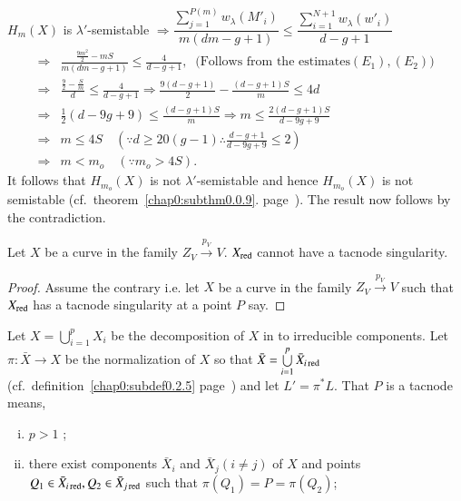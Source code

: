 { $H_{m} (X)$ is $\lambda'$-semistable $\Rightarrow
\dfrac{\sum\limits^{P(m)}_{j=1} w_{\lambda}(M'_{i})}{m (dm-g+1)} \le
\dfrac{\sum\limits^{N+1}_{i=1} w_{\lambda}(w'_{i})}{d-g+1}$  
\begin{align*}
\Rightarrow  & \frac{\frac{9m^{2}}{2} - mS}{m (dm - g+1)} \le
\frac{4}{d-g+1},  ~\text{ (Follows from the estimates} (E_{1}),
(E_{2}))\\ 
\Rightarrow & \frac{\frac{9}{2} - \frac{S}{m}}{d} \le \frac{4}{d - g +
  1} \Rightarrow \frac{9(d - g + 1)}{2} - \frac{(d-g+1)S}{m} \le 4d\\ 
\Rightarrow & \frac{1}{2} (d-9g+9) \le \frac{(d-g+1)S}{m} \Rightarrow
m\le \frac{2 (d-g+1)S}{d-9g+9}\\ 
\Rightarrow & m \le 4S   \quad (\because d \ge 20 (g-1)  \therefore
\frac{d-g+1}{d-9g+9} \le 2)\\ 
\Rightarrow & m < m_{o} \quad (\because  m_{o} > 4S).  
\end{align*}\pageoriginale
It follows that $H_{m_{o}}(X)$ is not $\lambda'$-semistable and hence
$H_{m_{o}}(X)$ is not semistable (cf.\ theorem~\ref{chap0:subthm0.0.9}. 
page~\pageref{chap0:subthm0.0.9}). The result now follows by the contradiction.   

\begin{subprop}\label{chap1:subprop1.0.6}%
 Let $X$ be a curve in the family $Z_{V}
 \xrightarrow{p_{V}}V$. $X_{\operatorname{red}}$  cannot have a tacnode singularity.  
\end{subprop}

\begin{proof}
Assume the contrary i.e. let $X$ be a curve in the family $Z_{V}
\xrightarrow{p_{V}}V$ such that $X_{\operatorname{red}}$ has a tacnode singularity
at a point $P$ say.  
\end{proof}

Let $X = \bigcup\limits^{p}_{i=1} X_{i}$ be the decomposition of $X$ 
in to irreducible components. Let $\pi : \bar{X} \to X$ be the
normalization of $X$ so that $\bar{X} = \bigcup\limits^{p}_{i=1}
\bar{X}_{i \operatorname{red}}$ (cf.\ definition~\ref{chap0:subdef0.2.5} 
page~\pageref{chap0:subdef0.2.5}) and let 
$L' = \pi^{*} L$. That $P$ is a tacnode means, 
\begin{enumerate}[i)]
\item $p > 1$ ;

\item there exist components $\bar{X}_{i}$ and $\bar{X}_{j} (i \neq
  j)$ of $X$ and points $Q_{1} \in \bar{X}_{i \operatorname{red}}, Q_{2}
  \in \bar{X}_{j \operatorname{red}}$ such that $\pi (Q_{1}) = P = \pi
  (Q_{2})$;  


\end{enumerate}}
